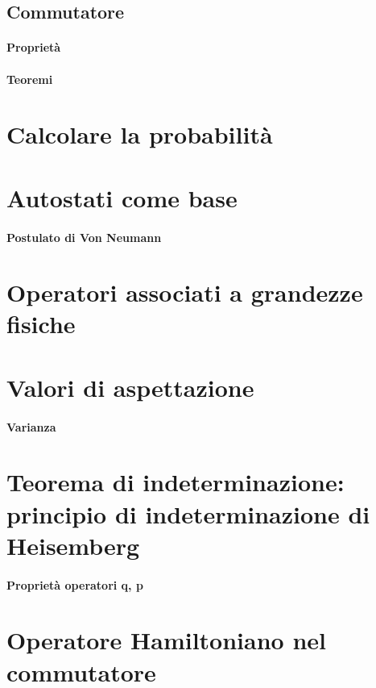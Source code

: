 \documentclass[]{article}
\begin{document}
\subsection{Commutatore}
	\paragraph{Proprietà}
	\paragraph{Teoremi}
	
	
\section{Calcolare la probabilità}
	
\section{Autostati come base}
	\paragraph{Postulato di Von Neumann}
	
\section{Operatori associati a grandezze fisiche}

\section{Valori di aspettazione}
	\paragraph{Varianza}
	
\section{Teorema di indeterminazione: principio di indeterminazione di Heisemberg}
	\paragraph{Proprietà operatori q, p}
	
	
\section{Operatore Hamiltoniano nel commutatore}
\end{document}
